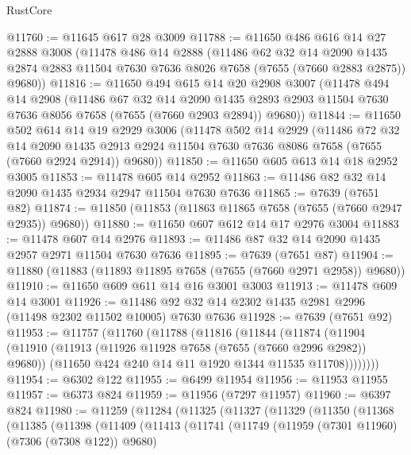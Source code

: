 \begin{lexlean}{RustCore}
\begin{coremodule}
@11760 := @11645 @617 @28 @3009
@11788 := @11650
    @486
    @616
    @14
    @27
    @2888
    @3008
    (@11478
      @486
      @14
      @2888
      (@11486
        @62
        @32
        @14
        @2090
        @1435
        @2874
        @2883
        @11504
        @7630
        @7636
        @8026
        @7658
        (@7655 (@7660 @2883 @2875))
        @9680))
@11816 := @11650
    @494
    @615
    @14
    @20
    @2908
    @3007
    (@11478
      @494
      @14
      @2908
      (@11486
        @67
        @32
        @14
        @2090
        @1435
        @2893
        @2903
        @11504
        @7630
        @7636
        @8056
        @7658
        (@7655 (@7660 @2903 @2894))
        @9680))
@11844 := @11650
    @502
    @614
    @14
    @19
    @2929
    @3006
    (@11478
      @502
      @14
      @2929
      (@11486
        @72
        @32
        @14
        @2090
        @1435
        @2913
        @2924
        @11504
        @7630
        @7636
        @8086
        @7658
        (@7655 (@7660 @2924 @2914))
        @9680))
@11850 := @11650 @605 @613 @14 @18 @2952 @3005
@11853 := @11478 @605 @14 @2952
@11863 := @11486 @82 @32 @14 @2090 @1435 @2934 @2947 @11504 @7630 @7636
@11865 := @7639 (@7651 @82)
@11874 := @11850 (@11853 (@11863 @11865 @7658 (@7655 (@7660 @2947 @2935)) @9680))
@11880 := @11650 @607 @612 @14 @17 @2976 @3004
@11883 := @11478 @607 @14 @2976
@11893 := @11486 @87 @32 @14 @2090 @1435 @2957 @2971 @11504 @7630 @7636
@11895 := @7639 (@7651 @87)
@11904 := @11880 (@11883 (@11893 @11895 @7658 (@7655 (@7660 @2971 @2958)) @9680))
@11910 := @11650 @609 @611 @14 @16 @3001 @3003
@11913 := @11478 @609 @14 @3001
@11926 := @11486 @92 @32 @14 @2302 @1435 @2981 @2996 (@11498 @2302 @11502 @10005) @7630 @7636
@11928 := @7639 (@7651 @92)
@11953 := @11757
    (@11760
      (@11788
        (@11816
          (@11844
            (@11874
              (@11904
                (@11910
                  (@11913 (@11926 @11928 @7658 (@7655 (@7660 @2996 @2982)) @9680))
                  (@11650 @424 @240 @14 @11 @1920 @1344 @11535 @11708))))))))
@11954 := @6302 @122
@11955 := @6499 @11954
@11956 := @11953 @11955
@11957 := @6373 @824
@11959 := @11956 (@7297 @11957)
@11960 := @6397 @824
@11980 := @11259
    (@11284
      (@11325
        (@11327
          (@11329
            (@11350
              (@11368
                (@11385
                  (@11398
                    (@11409
                      (@11413
                        (@11741
                          (@11749
                            (@11959 (@7301 @11960) (@7306 (@7308 @122)) @9680)

\end{coremodule}
\end{lexlean}
